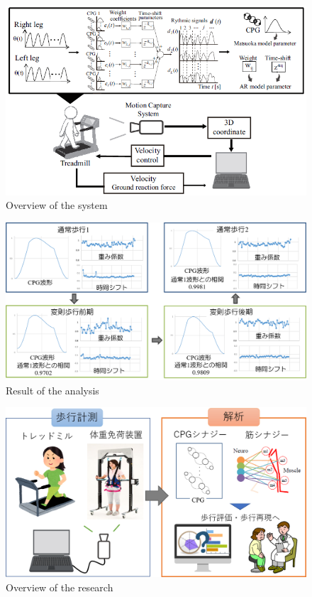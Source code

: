 \documentclass[graphicx,amsmath,cite]{jarticle}
\begin{document}
{%
\begin{figure}[H]
\begin{center}
 \includegraphics[width=\hsize]{fig/system.png}
\end{center}
\caption{Overview of the system}
 \label{system}
\end{figure}
\begin{figure}[H]
\begin{center}
 \includegraphics[width=\hsize]{fig/result.png}
\end{center}
\caption{Result of the analysis}
 \label{result}
\end{figure}
\begin{figure}[H]
\begin{center}
 \includegraphics[width=\hsize]{fig/research.png}
\end{center}
\caption{Overview of the research}
 \label{research}
\end{figure}


}
\end{document}
